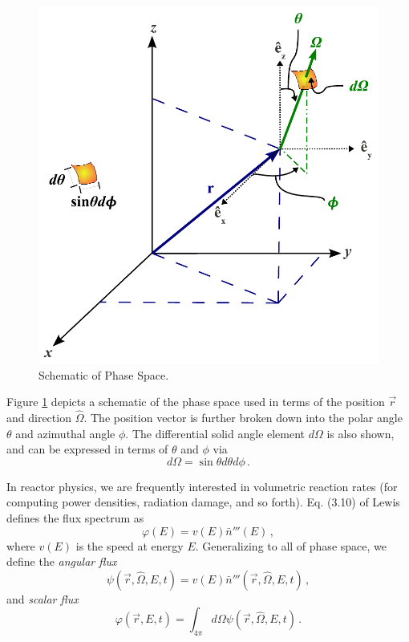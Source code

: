 \begin{figure}[ht]
    \centering
    \includegraphics[keepaspectratio, width = 2.7 in]{figs/chap_transport/phase_space}
    \caption{Schematic of Phase Space.}
    \label{fig:phase_space}
\end{figure}

Figure \ref{fig:phase_space} depicts a schematic of the phase space used in 
terms of the position $\vec{r}$ and direction $\hat{\Omega}$.  The position 
vector is further broken down into the polar angle $\theta$ and azimuthal 
angle $\phi$.  The differential solid angle element $d\Omega$ is also shown, 
and can be expressed in terms of $\theta$ and $\phi$ via
\begin{equation*}
 d\Omega = \sin{\theta} d\theta d\phi \, .
\end{equation*}  

In reactor physics, we are frequently interested in volumetric reaction rates 
(for computing power densities, radiation damage, and so forth).  Eq. (3.10) of 
Lewis defines the flux spectrum as
\begin{equation*}
 \varphi(E) = v(E)\bar{n}'''(E) \, ,
\end{equation*}
where $v(E)$ is the speed at energy $E$.  Generalizing to all of phase space, 
we define the \textit{angular flux}
\begin{equation}
   \psi (\vec{r},\hat{\Omega},E,t) = v(E) \bar{n}'''(\vec{r},\hat{\Omega},E,t) \, ,
\label{eq:angularflux}
\end{equation}
and \textit{scalar flux}
\begin{equation}
    \varphi (\vec{r},E,t) = \int_{4\pi} d\Omega \psi (\vec{r},\hat{\Omega},E,t) \, .
\label{eq:scalarflux}
\end{equation}

